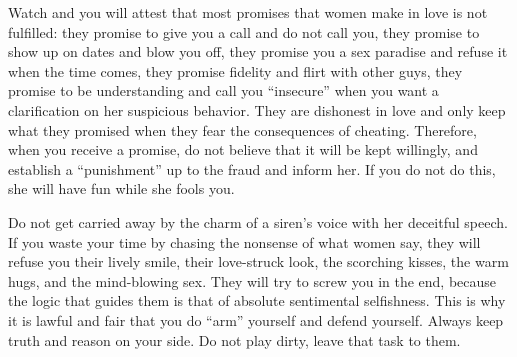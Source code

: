 \par Watch and you will attest that most promises that women make in love is not fulfilled: they promise to give you a call and do not call you, they promise to show up on dates and blow you off, they promise you a sex paradise and refuse it when the time comes, they promise fidelity and flirt with other guys, they promise to be understanding and call you \enquote{insecure} when you want a clarification on her suspicious behavior. They are dishonest in love and only keep what they promised when they fear the consequences of cheating. Therefore, when you receive a promise, do not believe that it will be kept willingly, and establish a \enquote{punishment} up to the fraud and inform her. If you do not do this, she will have fun while she fools you.

\par Do not get carried away by the charm of a siren's voice with her deceitful speech. If you waste your time by chasing the nonsense of what women say, they will refuse you their lively smile, their love-struck look, the scorching kisses, the warm hugs, and the mind-blowing sex. They will try to screw you in the end, because the logic that guides them is that of absolute sentimental selfishness. This is why it is lawful and fair that you do \enquote{arm} yourself and defend yourself. Always keep truth and reason on your side. Do not play dirty, leave that task to them.